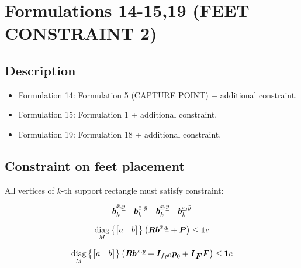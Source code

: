 \section{Formulations 14-15,19 (FEET CONSTRAINT 2)}


\subsection{Description}
\begin{itemize}
    \item Formulation 14: Formulation 5 (CAPTURE POINT) + additional constraint.
    \item Formulation 15: Formulation 1 + additional constraint.
    \item Formulation 19: Formulation 18 + additional constraint.
\end{itemize}



\subsection{Constraint on feet placement}
All vertices of $k$-th support rectangle must satisfy constraint:

\begin{equation*}
    \mbox{\boldmath $b$}^{\bar{x},\underline{y}}_k
    \quad
    \mbox{\boldmath $b$}^{\bar{x},\bar{y}}_k
    \quad
    \mbox{\boldmath $b$}^{\underline{x},\underline{y}}_k
    \quad
    \mbox{\boldmath $b$}^{\underline{x},\bar{y}}_k
\end{equation*}

\begin{equation*}
    \underset{M}{\operatorname{diag}}\left\{\begin{bmatrix} a & b \end{bmatrix}\right\}
    \left(
        \mbox{\boldmath $R$}
        \mbox{\boldmath $b$}^{\bar{x},\underline{y}}
        +
        \mbox{\boldmath $P$}
    \right)
    \le
    \mbox{\boldmath $1$} c
\end{equation*}


\begin{equation*}
    \underset{M}{\operatorname{diag}}\left\{\begin{bmatrix} a & b \end{bmatrix}\right\}
    \left(
        \mbox{\boldmath $R$}
        \mbox{\boldmath $b$}^{\bar{x},\underline{y}}
        +
        \mbox{\boldmath $I$}_{fp0}
        \mbox{\boldmath $p$}_0
        +
        \mbox{\boldmath $I$}_{\mbox{\boldmath $F$}}
        \mbox{\boldmath $F$}
    \right)
    \le
    \mbox{\boldmath $1$} c
\end{equation*}


